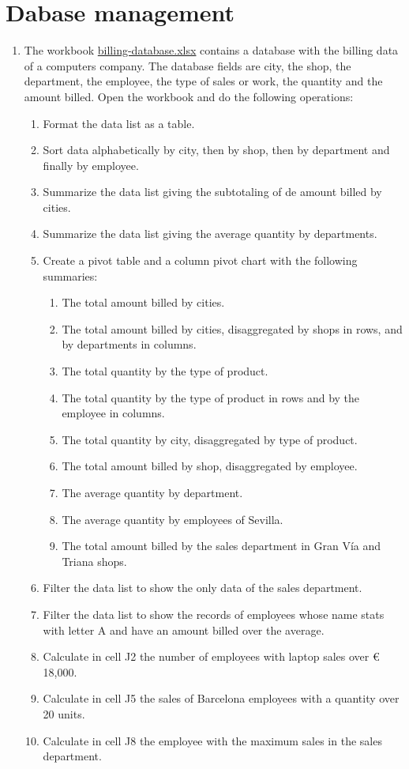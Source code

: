 
\section{Dabase management}
\begin{enumerate}[leftmargin=*]
\item The workbook
\href{http://aprendeconalf.es/office/excel/exercises/databases/billing-database.xlsx}{\textsf{billing-database.xlsx}}
contains a database with the billing data of a computers company.
The database fields are city, the shop, the department, the employee, the type of sales or work, the quantity and the
amount billed. 
Open the workbook and do the following operations:
\begin{enumerate}
\item Format the data list as a table.
\item Sort data alphabetically by city, then by shop, then by department and finally by employee.
\item Summarize the data list giving the subtotaling of de amount billed by cities. 
\item Summarize the data list giving the average quantity by departments. 
\item Create a pivot table and a column pivot chart with the following summaries: 
\begin{enumerate}
\item The total amount billed by cities.  
\item The total amount billed by cities, disaggregated by shops in rows, and by departments in columns.  
\item The total quantity by the type of product. 
\item The total quantity by the type of product in rows and by the employee in columns.  
\item The total quantity by city, disaggregated by type of product. 
\item The total amount billed by shop, disaggregated by employee.
\item The average quantity by department. 
\item The average quantity by employees of Sevilla. 
\item The total amount billed by the sales department in Gran Vía and Triana shops.    
\end{enumerate}
\item Filter the data list to show the only data of the sales department.
\item Filter the data list to show the records of employees whose name stats with letter A and have an amount
billed over the average.
\item Calculate in cell J2 the number of employees with laptop sales over € 18,000.  
\item Calculate in cell J5 the sales of Barcelona employees with a quantity over 20 units. 
\item Calculate in cell J8 the employee with the maximum sales in the sales department.
\end{enumerate}



\end{enumerate}
